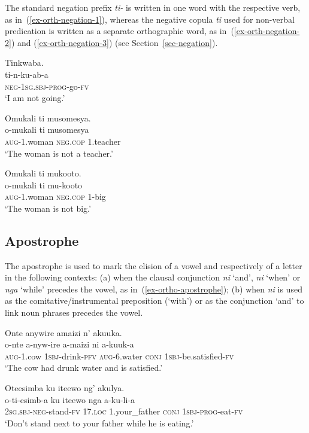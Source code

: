 The standard negation prefix  \textit{ti-} is written in one word with the respective verb, as in~(\ref{ex-orth-negation-1}), whereas the negative copula  \textit{ti} used for non-verbal predication is written as a separate orthographic word, as in~(\ref{ex-orth-negation-2}) and (\ref{ex-orth-negation-3}) (see Section~\ref{sec-negation}).

\ea \label{ex-orth-negation}
\begin{xlist}	
\ex \label{ex-orth-negation-1}
	\glll Tinkwaba.\\
	 ti-n-ku-ab-a\\
		\textsc{neg}-\textsc{1sg.sbj}-\textsc{prog}-go-\textsc{fv}\\
	\glt ‘I am not going.’ 	

\ex \label{ex-orth-negation-2}
	\glll Omukali ti musomesya.\\
	 o-mukali ti musomesya\\
		\textsc{aug}-1.woman \textsc{neg}.\textsc{cop} 1.teacher\\
	\glt ‘The woman is not a teacher.’ 
	
\ex \label{ex-orth-negation-3}
	\glll  Omukali ti mukooto.\\
	o-mukali ti mu-kooto\\
		\textsc{aug}-1.woman \textsc{neg}.\textsc{cop} 1-big\\
	\glt ‘The woman is not big.’
\end{xlist}
\z


\subsection{Apostrophe}\label{sec-orthography-apostrophe}

The apostrophe is used to mark the elision of a vowel and respectively of a letter in the following contexts:
(a) when the clausal conjunction  \textit{ni} `and',  \textit{ni} `when' or  \textit{nga} `while' precedes the vowel, as in~(\ref{ex-ortho-apostrophe}); 
(b) when  \textit{ni} is used as the comitative/instrumental preposition  (`with') or as the conjunction `and' to link noun phrases precedes the vowel.

\ea \label{ex-ortho-apostrophe}
\begin{xlist}	
    \ex \label{ex-ortho-apostrophe-a}
    \glll	Onte anywire amaizi n' akuuka.\\
        o-nte a-nyw-ire a-maizi ni a-kuuk-a\\
	\textsc{aug}-1.cow \textsc{1sbj}-drink-\textsc{pfv} \textsc{aug}-6.water \textsc{conj} \textsc{1sbj}-be.satisfied-\textsc{fv}\\
    \glt  ‘The cow had drunk water and is satisfied.’
	  
\ex  \label{ex-ortho-apostrophe-b}
    \glll	Oteesimba ku iteewo ng' akulya.\\
    	   o-ti-esimb-a ku iteewo nga a-ku-li-a\\
	2\textsc{sg.sbj}-\textsc{neg}-stand-\textsc{fv} 17.\textsc{loc} 1.your\_father \textsc{conj} \textsc{1sbj}-\textsc{prog}-eat-\textsc{fv}\\
    \glt  ‘Don’t stand next to your father while he is eating.'
    
\end{xlist}	
\z
